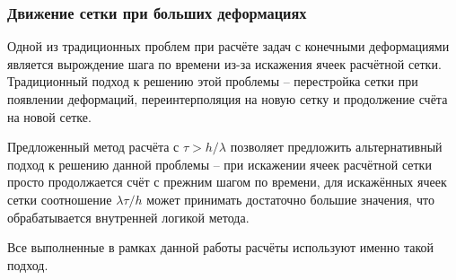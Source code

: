 \clearpage
\newpage

\subsubsection{Движение сетки при больших деформациях}

Одной из традиционных проблем при расчёте задач с конечными деформациями является вырождение шага по времени из-за искажения ячеек расчётной сетки. Традиционный подход к решению этой проблемы -- перестройка сетки при появлении деформаций, переинтерполяция на новую сетку и продолжение счёта на новой сетке.

Предложенный метод расчёта с $\tau > h / \lambda$ позволяет предложить альтернативный подход к решению данной проблемы -- при искажении ячеек расчётной сетки просто продолжается счёт с прежним шагом по времени, для искажённых ячеек сетки соотношение $\lambda \tau / h$ может принимать достаточно большие значения, что обрабатывается внутренней логикой метода.

Все выполненные в рамках данной работы расчёты используют именно такой подход.

